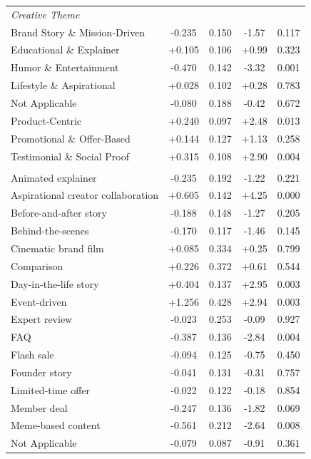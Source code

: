 \begin{longtable}{lcccc}
\multicolumn{5}{l}{\textit{Creative Theme}} \\
\quad Brand Story \& Mission-Driven & -0.235 & 0.150 & -1.57 & 0.117 \\
\quad Educational \& Explainer & +0.105 & 0.106 & +0.99 & 0.323 \\
\quad Humor \& Entertainment & -0.470\sym{***} & 0.142 & -3.32 & 0.001 \\
\quad Lifestyle \& Aspirational & +0.028 & 0.102 & +0.28 & 0.783 \\
\quad Not Applicable & -0.080 & 0.188 & -0.42 & 0.672 \\
\quad Product-Centric & +0.240\sym{*} & 0.097 & +2.48 & 0.013 \\
\quad Promotional \& Offer-Based & +0.144 & 0.127 & +1.13 & 0.258 \\
\quad Testimonial \& Social Proof & +0.315\sym{**} & 0.108 & +2.90 & 0.004 \\
\addlinespace
\multicolumn{5}{l}{\textit{Creative Concept}} \\
\quad Animated explainer & -0.235 & 0.192 & -1.22 & 0.221 \\
\quad Aspirational creator collaboration & +0.605\sym{***} & 0.142 & +4.25 & 0.000 \\
\quad Before-and-after story & -0.188 & 0.148 & -1.27 & 0.205 \\
\quad Behind-the-scenes & -0.170 & 0.117 & -1.46 & 0.145 \\
\quad Cinematic brand film & +0.085 & 0.334 & +0.25 & 0.799 \\
\quad Comparison & +0.226 & 0.372 & +0.61 & 0.544 \\
\quad Day-in-the-life story & +0.404\sym{**} & 0.137 & +2.95 & 0.003 \\
\quad Event-driven & +1.256\sym{**} & 0.428 & +2.94 & 0.003 \\
\quad Expert review & -0.023 & 0.253 & -0.09 & 0.927 \\
\quad FAQ & -0.387\sym{**} & 0.136 & -2.84 & 0.004 \\
\quad Flash sale & -0.094 & 0.125 & -0.75 & 0.450 \\
\quad Founder story & -0.041 & 0.131 & -0.31 & 0.757 \\
\quad Limited-time offer & -0.022 & 0.122 & -0.18 & 0.854 \\
\quad Member deal & -0.247 & 0.136 & -1.82 & 0.069 \\
\quad Meme-based content & -0.561\sym{**} & 0.212 & -2.64 & 0.008 \\
\quad Not Applicable & -0.079 & 0.087 & -0.91 & 0.361 \\

\end{longtable}
